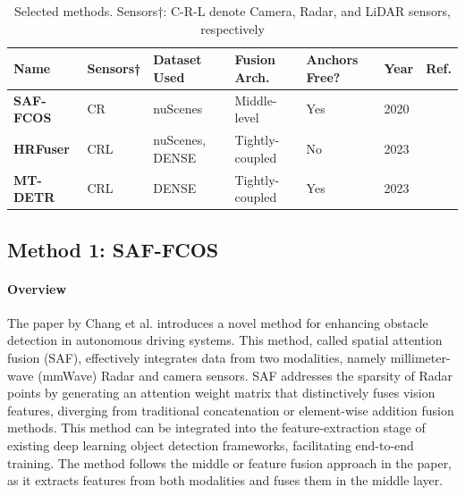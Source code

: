 \documentclass[report.tex]{subfiles}
\begin{document}
        \begin{table}[h]
            \centering
            \caption{Selected methods. Sensors†: C-R-L denote Camera, Radar, and LiDAR sensors, respectively}
            \begin{tabular}{|l|l|l|l|l|l|l|}
            \hline
            \textbf{Name} & \textbf{Sensors†} & \textbf{Dataset Used} & \textbf{Fusion Arch.} & \textbf{Anchors Free?} & \textbf{Year} & \textbf{Ref.}\\ \hline
            \textbf{SAF-FCOS} & CR & nuScenes & Middle-level & Yes & 2020 & \cite{chang2020spatial} \\ \hline
            \textbf{HRFuser} & CRL & nuScenes, DENSE & Tightly-coupled & No & 2023 & \cite{broedermann2022hrfuser} \\ \hline
            \textbf{MT-DETR} & CRL & DENSE & Tightly-coupled & Yes & 2023 & \cite{chu2023mt} \\ \hline
            \end{tabular}
            \label{tab:selected_methods}
        \end{table}

    

    \subsection{Method 1: SAF-FCOS}
    \label{sec:method_1}

    \paragraph*{Overview}
    
    The paper by Chang et al. \cite{chang2020spatial} introduces a novel method for enhancing obstacle detection in autonomous driving systems. This method, called spatial attention fusion (SAF), effectively integrates data from two modalities, namely millimeter-wave (mmWave) Radar and camera sensors. SAF addresses the sparsity of Radar points by generating an attention weight matrix that distinctively fuses vision features, diverging from traditional concatenation or element-wise addition fusion methods. This method can be integrated into the feature-extraction stage of existing deep learning object detection frameworks, facilitating end-to-end training. The method follows the middle or feature fusion approach in the paper, as it extracts features from both modalities and fuses them in the middle layer. 
\end{document}
